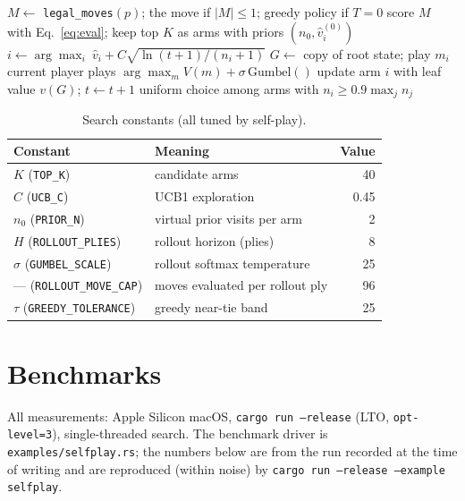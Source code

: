\documentclass[11pt]{article}
\newcommand{\code}[1]{\texttt{#1}}
\begin{document}
\begin{algorithm}[t]
\caption{Budgeted UCB1 move selection for player $p$}
\label{alg:bandit}
\begin{algorithmic}[1]
\State $M \gets$ \code{legal\_moves}$(p)$;\; \Return the move if $|M|\le 1$; greedy policy if $T=0$
\State score $M$ with Eq.~\eqref{eq:eval}; keep top $K$ as arms with priors $(n_0, \hat v_i^{(0)})$
  \State $i \gets \arg\max_i\ \hat v_i + C\sqrt{\ln(t+1)/(n_i+1)}$
  \State $G \gets$ copy of root state; play $m_i$
    \State current player plays $\arg\max_m V(m) + \sigma\,\mathrm{Gumbel}()$ 
  \EndFor
  \State update arm $i$ with leaf value $v(G)$;\; $t \gets t+1$
\EndWhile
\State \Return uniform choice among arms with $n_i \ge 0.9\max_j n_j$
\end{algorithmic}
\end{algorithm}

\begin{table}[t]
\centering
\caption{Search constants (all tuned by self-play).}
\label{tab:constants}
\begin{tabular}{llr}
\toprule
Constant & Meaning & Value \\
\midrule
$K$ (\code{TOP\_K}) & candidate arms & 40 \\
$C$ (\code{UCB\_C}) & UCB1 exploration & 0.45 \\
$n_0$ (\code{PRIOR\_N}) & virtual prior visits per arm & 2 \\
$H$ (\code{ROLLOUT\_PLIES}) & rollout horizon (plies) & 8 \\
$\sigma$ (\code{GUMBEL\_SCALE}) & rollout softmax temperature & 25 \\
--- (\code{ROLLOUT\_MOVE\_CAP}) & moves evaluated per rollout ply & 96 \\
$\tau$ (\code{GREEDY\_TOLERANCE}) & greedy near-tie band & 25 \\
\bottomrule
\end{tabular}
\end{table}

\section{Benchmarks}
\label{sec:benchmarks}

All measurements: Apple Silicon macOS, \code{cargo run --release} (LTO,
\code{opt-level=3}), single-threaded search. The benchmark driver is
\code{examples/selfplay.rs}; the numbers below are from the run recorded at
the time of writing and are reproduced (within noise) by
\code{cargo run --release --example selfplay}.
\end{document}
